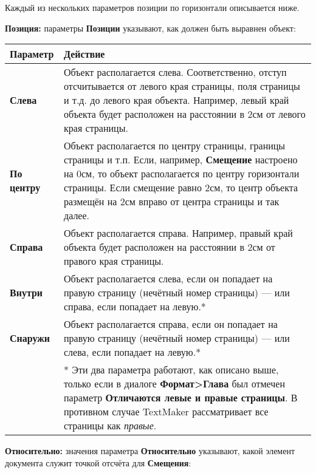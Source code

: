 ﻿\documentclass[a4paper,10pt]{article}
\begin{document}
Каждый из нескольких параметров позиции по горизонтали описывается ниже.

\textbf{Позиция:} параметры \textbf{Позиции} указывают, как должен быть выравнен объект:

\begin{center}
\begin{tabular}{  m{4cm}  m{12cm}  }
 \textbf{Параметр} & \textbf{Действие}\\ 
 \hline
  \textbf{Слева} & Объект располагается слева. Соответственно, отступ отсчитывается от левого края страницы, поля страницы и т.д. до левого края объекта. Например, левый край объекта будет расположен на расстоянии в 2см от левого края страницы.\\
  \textbf{По центру} & Объект располагается по центру страницы, границы страницы и т.п. Если, например, \textbf{Смещение} настроено на 0см, то объект располагается по центру горизонтали страницы. Если смещение равно 2см, то центр объекта размещён на 2см вправо от центра страницы и так далее.\\ 
\textbf{Справа} & Объект располагается справа. Например, правый край объекта будет расположен на расстоянии в 2см от правого края страницы.\\
\textbf{Внутри} & Объект располагается слева, если он попадает на правую страницу (нечётный номер страницы) — или справа, если попадает на левую.*\\
\textbf{Снаружи} & Объект располагается справа, если он попадает на правую страницу (нечётный номер страницы) — или слева, если попадает на левую.*\\
 & * Эти два параметра работают, как описано выше, только если в диалоге \textbf{Формат>Глава} был отмечен параметр \textbf{Отличаются левые и правые страницы}. В противном случае TextMaker рассматривает все страницы как \textit{правые}.
\end{tabular}
\end{center}

\textbf{Относительно:} значения параметра \textbf{Относительно} указывают, какой элемент документа служит точкой отсчёта для \textbf{Смещения}:
\end{document}
